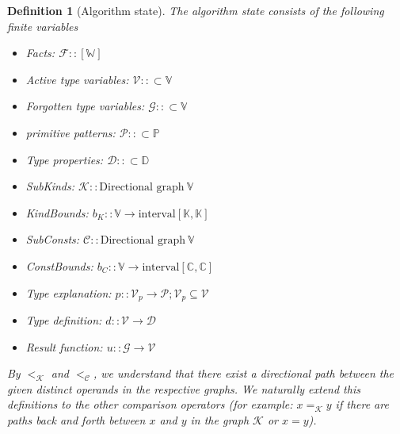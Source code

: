 \documentclass[12pt,a4paper]{article}
\newtheorem{definition}{Definition}
\begin{document}
\begin{definition}[Algorithm state]
    The algorithm state consists of the following finite variables
    \begin{itemize}
        \item Facts: $\mathcal{F} :: [\mathbb{W}]$
        \item Active type variables: $\mathcal{V} :: \subset \mathbb{V}$
        \item Forgotten type variables: $\mathcal{G} :: \subset \mathbb{V}$
        \item primitive patterns: $\mathcal{P} :: \subset \mathbb{P}$
        \item Type properties: $\mathcal{D} :: \subset \mathbb{D}$
        \item SubKinds: $\mathcal{K} :: \text{Directional graph}\ \mathbb{V}$
        \item KindBounds: $b_K :: \mathbb{V} \to \text{interval} \left[\mathbb{K}, \mathbb{K}\right]$
        \item SubConsts: $\mathcal{C} :: \text{Directional graph}\ \mathbb{V}$
        \item ConstBounds: $b_C :: \mathbb{V} \to \text{interval} \left[\mathbb{C}, \mathbb{C}\right]$
        \item Type explanation: $p :: \mathcal{V}_p \to \mathcal{P}; \mathcal{V}_p \subseteq \mathcal{V}$
        \item Type definition: $d :: \mathcal{V} \to \mathcal{D}$
        \item Result function: $u :: \mathcal{G} \to \mathcal{V}$
    \end{itemize}

    By $<_\mathcal{K}$ and $<_\mathcal{C}$, we understand that there exist a directional path between the given distinct operands in the respective graphs. We naturally extend this definitions to the other comparison operators (for example: $x =_\mathcal{K} y$ if there are paths back and forth between $x$ and $y$ in the graph $\mathcal{K}$ or $x = y$). %

\end{definition}
\end{document}

